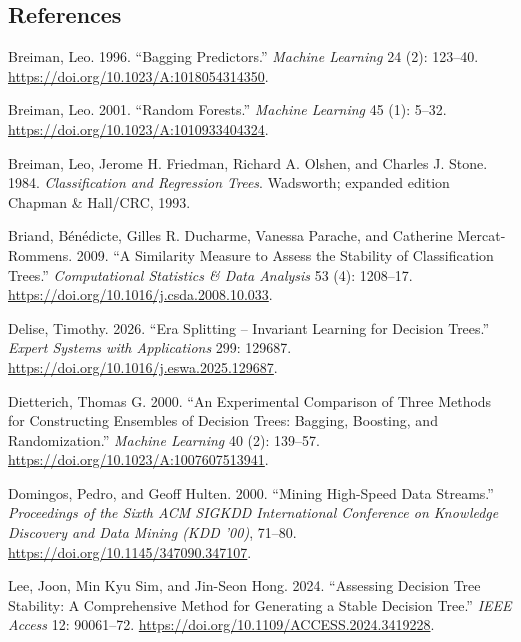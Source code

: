 \documentclass[
  conference]{IEEEtran}
\newlength{\cslhangindent}
\newenvironment{CSLReferences}[2] %
 {\begin{list}{}{%
  \setlength{\itemindent}{0pt}
  \setlength{\leftmargin}{0pt}
  \setlength{\parsep}{0pt}
  \ifodd #1
   \setlength{\leftmargin}{\cslhangindent}
   \setlength{\itemindent}{-1\cslhangindent}
  \fi
  \setlength{\itemsep}{#2\baselineskip}}}
 {\end{list}}
\begin{document}
\subsection{References}\label{references}

\protect{}\label{refs}
\begin{CSLReferences}{1}{1}
Breiman, Leo. 1996. {``Bagging Predictors.''} \emph{Machine Learning} 24
(2): 123--40. \url{https://doi.org/10.1023/A:1018054314350}.

Breiman, Leo. 2001. {``Random Forests.''} \emph{Machine Learning} 45
(1): 5--32. \url{https://doi.org/10.1023/A:1010933404324}.

Breiman, Leo, Jerome H. Friedman, Richard A. Olshen, and Charles J.
Stone. 1984. \emph{Classification and Regression Trees}. Wadsworth;
expanded edition Chapman \& Hall/CRC, 1993.

Briand, Bénédicte, Gilles R. Ducharme, Vanessa Parache, and Catherine
Mercat-Rommens. 2009. {``A Similarity Measure to Assess the Stability of
Classification Trees.''} \emph{Computational Statistics \& Data
Analysis} 53 (4): 1208--17.
\url{https://doi.org/10.1016/j.csda.2008.10.033}.

Delise, Timothy. 2026. {``Era Splitting -- Invariant Learning for
Decision Trees.''} \emph{Expert Systems with Applications} 299: 129687.
\url{https://doi.org/10.1016/j.eswa.2025.129687}.

Dietterich, Thomas G. 2000. {``An Experimental Comparison of Three
Methods for Constructing Ensembles of Decision Trees: Bagging, Boosting,
and Randomization.''} \emph{Machine Learning} 40 (2): 139--57.
\url{https://doi.org/10.1023/A:1007607513941}.

Domingos, Pedro, and Geoff Hulten. 2000. {``Mining High-Speed Data
Streams.''} \emph{Proceedings of the Sixth ACM SIGKDD International
Conference on Knowledge Discovery and Data Mining (KDD '00)}, 71--80.
\url{https://doi.org/10.1145/347090.347107}.

Lee, Joon, Min Kyu Sim, and Jin-Seon Hong. 2024. {``Assessing Decision
Tree Stability: A Comprehensive Method for Generating a Stable Decision
Tree.''} \emph{IEEE Access} 12: 90061--72.
\url{https://doi.org/10.1109/ACCESS.2024.3419228}.


\end{CSLReferences}
\end{document}
